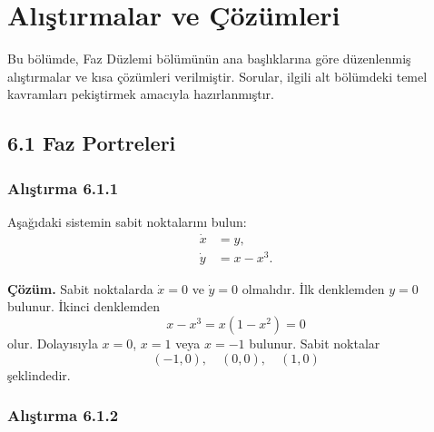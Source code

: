 \chapter*{Alıştırmalar ve Çözümleri}
{}

\begin{justify}
Bu bölümde, Faz Düzlemi bölümünün ana başlıklarına göre düzenlenmiş alıştırmalar ve kısa çözümleri verilmiştir. Sorular, ilgili alt bölümdeki temel kavramları pekiştirmek amacıyla hazırlanmıştır.
\end{justify}

\section*{6.1 Faz Portreleri}

\subsection*{Alıştırma 6.1.1}

\begin{justify}
Aşağıdaki sistemin sabit noktalarını bulun:
\begin{align}
\dot{x} &= y,\\
\dot{y} &= x-x^3.
\end{align}

\textbf{Çözüm.} Sabit noktalarda $\dot{x}=0$ ve $\dot{y}=0$ olmalıdır. İlk denklemden $y=0$ bulunur. İkinci denklemden
\begin{equation}
x-x^3=x(1-x^2)=0
\end{equation}
olur. Dolayısıyla $x=0$, $x=1$ veya $x=-1$ bulunur. Sabit noktalar
\begin{equation}
(-1,0),\quad (0,0),\quad (1,0)
\end{equation}
şeklindedir.
\end{justify}

\subsection*{Alıştırma 6.1.2}

